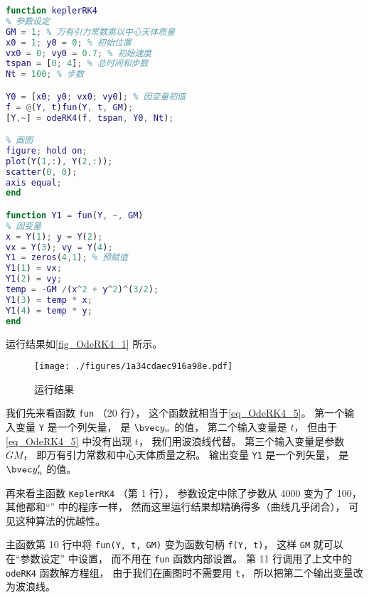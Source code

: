\begin{lstlisting}[language=matlab, caption=keplerRK4.m]
function keplerRK4
% 参数设定
GM = 1; % 万有引力常数乘以中心天体质量
x0 = 1; y0 = 0; % 初始位置
vx0 = 0; vy0 = 0.7; % 初始速度
tspan = [0; 4]; % 总时间和步数
Nt = 100; % 步数

Y0 = [x0; y0; vx0; vy0]; % 因变量初值
f = @(Y, t)fun(Y, t, GM);
[Y,~] = odeRK4(f, tspan, Y0, Nt);

% 画图
figure; hold on;
plot(Y(1,:), Y(2,:));
scatter(0, 0);
axis equal;
end

function Y1 = fun(Y, ~, GM)
% 因变量
x = Y(1); y = Y(2);
vx = Y(3); vy = Y(4);
Y1 = zeros(4,1); % 预赋值
Y1(1) = vx;
Y1(2) = vy;
temp = -GM /(x^2 + y^2)^(3/2);
Y1(3) = temp * x;
Y1(4) = temp * y;
end
\end{lstlisting}

运行结果如\autoref{fig_OdeRK4_1} 所示。

\begin{figure}[ht]
\centering
\texttt{[image: ./figures/1a34cdaec916a98e.pdf]}
\caption{运行结果} \label{fig_OdeRK4_1}
\end{figure}

我们先来看函数 \verb`fun` （20 行）， 这个函数就相当于\autoref{eq_OdeRK4_5}。 第一个输入变量 \verb`Y` 是一个列矢量， 是 $\bvec y_n$ 的值， 第二个输入变量是 $t$， 但由于\autoref{eq_OdeRK4_5} 中没有出现 $t$， 我们用波浪线代替。 第三个输入变量是参数 $GM$， 即万有引力常数和中心天体质量之积。 输出变量 \verb`Y1` 是一个列矢量， 是 $\bvec y'_n$ 的值。

再来看主函数 \verb`KeplerRK4` （第 1 行）， 参数设定中除了步数从 4000 变为了 100， 其他都和“” 中的程序一样， 然而这里运行结果却精确得多（曲线几乎闭合）， 可见这种算法的优越性。

主函数第 10 行中将 \verb`fun(Y, t, GM)` 变为函数句柄 \verb`f(Y, t)`， 这样 \verb`GM` 就可以在“参数设定” 中设置， 而不用在 \verb`fun` 函数内部设置。 第 11 行调用了上文中的 \verb`odeRK4` 函数解方程组， 由于我们在画图时不需要用 \verb`t`， 所以把第二个输出变量改为波浪线。
